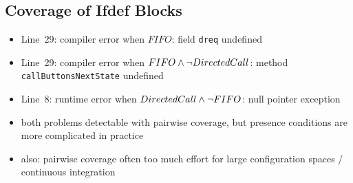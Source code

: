\subsection{Coverage of Ifdef Blocks}
\begin{frame}[b]
	\pause
	\begin{itemize}
		\item<+-> Line~29: compiler error when $FIFO$: field \texttt{dreq} undefined
		\item<+-> Line~29: compiler error when $FIFO \wedge \neg DirectedCall$: method \texttt{callButtonsNextState} undefined
		\item<+-> Line~8: runtime error when $DirectedCall \wedge \neg FIFO$: null pointer exception
		\item<+-> both problems detectable with pairwise coverage, but presence conditions are more complicated in practice
		\item<+-> also: pairwise coverage often too much effort for large configuration spaces / continuous integration
	\end{itemize}
\end{frame}

